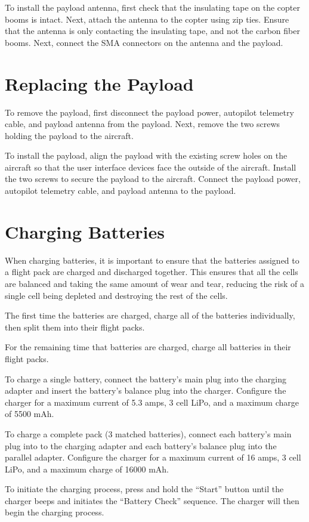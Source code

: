 \documentclass{report}
\begin{document}
		To install the payload antenna, first check that the insulating tape on the copter booms is intact.  Next, attach the antenna to the copter using zip ties.  Ensure that the antenna is only contacting the insulating tape, and not the carbon fiber booms.  Next, connect the SMA connectors on the antenna and the payload.
	\section{Replacing the Payload}
		To remove the payload, first disconnect the payload power, autopilot telemetry cable, and payload antenna from the payload.  Next, remove the two screws holding the payload to the aircraft.

		To install the payload, align the payload with the existing screw holes on the aircraft so that the user interface devices face the outside of the aircraft.  Install the two screws to secure the payload to the aircraft.  Connect the payload power, autopilot telemetry cable, and payload antenna to the payload.
	\section{Charging Batteries}
		When charging batteries, it is important to ensure that the batteries assigned to a flight pack are charged and discharged together.  This ensures that all the cells are balanced and taking the same amount of wear and tear, reducing the risk of a single cell being depleted and destroying the rest of the cells.

		The first time the batteries are charged, charge all of the batteries individually, then split them into their flight packs.

		For the remaining time that batteries are charged, charge all batteries in their flight packs.

		To charge a single battery, connect the battery's main plug into the charging adapter and insert the battery's balance plug into the charger.  Configure the charger for a maximum current of 5.3 amps, 3 cell LiPo, and a maximum charge of 5500 mAh.

		To charge a complete pack (3 matched batteries), connect each battery's main plug into to the charging adapter and each battery's balance plug into the parallel adapter.  Configure the charger for a maximum current of 16 amps, 3 cell LiPo, and a maximum charge of 16000 mAh.

		To initiate the charging process, press and hold the ``Start'' button until the charger beeps and initiates the ``Battery Check'' sequence.  The charger will then begin the charging process.
\end{document}
